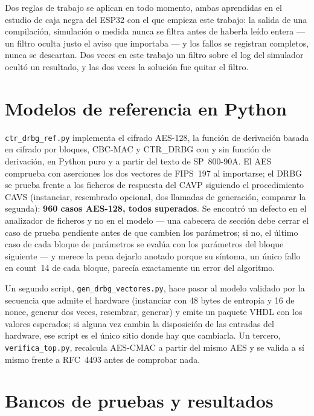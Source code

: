 Dos reglas de trabajo se aplican en todo momento, ambas aprendidas en el
estudio de caja negra del ESP32 con el que empieza este trabajo: la salida de una compilación,
simulación o medida nunca se filtra antes de haberla leído entera --- un
filtro oculta justo el aviso que importaba --- y los fallos se registran
completos, nunca se descartan. Dos veces en este trabajo un filtro sobre
el log del simulador ocultó un resultado, y las dos veces la solución fue
quitar el filtro.

\section{Modelos de referencia en Python}
\label{sec:refmodels}

\texttt{ctr\_drbg\_ref.py} implementa el cifrado AES-128, la función de
derivación basada en cifrado por bloques, CBC-MAC y CTR\_DRBG con y sin
función de derivación, en Python puro y a partir del texto de
SP~800-90A. El AES comprueba con aserciones los dos vectores de FIPS~197
al importarse; el DRBG se prueba frente a los ficheros de respuesta del
CAVP siguiendo el procedimiento CAVS (instanciar, resembrado opcional,
dos llamadas de generación, comparar la segunda): \textbf{960 casos
AES-128, todos superados}. Se encontró un defecto en el analizador de
ficheros y no en el modelo --- una cabecera de sección debe cerrar el
caso de prueba pendiente antes de que cambien los parámetros; si no, el
último caso de cada bloque de parámetros se evalúa con los parámetros del
bloque siguiente --- y merece la pena dejarlo anotado porque su síntoma,
un único fallo en count~14 de cada bloque, parecía exactamente un error
del algoritmo.

Un segundo script, \texttt{gen\_drbg\_vectores.py}, hace pasar al modelo
validado por la secuencia que admite el hardware (instanciar con 48
bytes de entropía y 16 de nonce, generar dos veces, resembrar, generar)
y emite un paquete VHDL con los valores esperados; si alguna vez cambia
la disposición de las entradas del hardware, ese script es el único
sitio donde hay que cambiarla. Un tercero, \texttt{verifica\_top.py},
recalcula AES-CMAC a partir del mismo AES y se valida a sí mismo frente
a RFC~4493 antes de comprobar nada.

\section{Bancos de pruebas y resultados}
\label{sec:testbenches}

